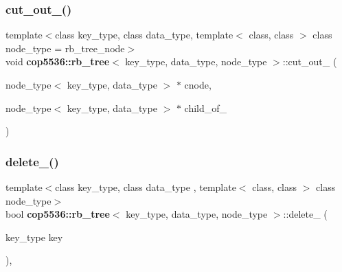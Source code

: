 \mbox{\label{classcop5536_1_1rb__tree_aa3fbcedf69c1875064fbb6b2befd74bf}} 
\subsubsection{cut\_out\_()}
{\footnotesize\ttfamily template$<$class key\+\_\+type, class data\+\_\+type, template$<$ class, class $>$ class node\+\_\+type = rb\+\_\+tree\+\_\+node$>$ \\
void \textbf{ cop5536\+::rb\+\_\+tree}$<$ key\+\_\+type, data\+\_\+type, node\+\_\+type $>$\+::cut\+\_\+out\+\_\+ (\begin{DoxyParamCaption}\item[{node\+\_\+type$<$ key\+\_\+type, data\+\_\+type $>$ $\ast$}]{cnode,  }\item[{node\+\_\+type$<$ key\+\_\+type, data\+\_\+type $>$ $\ast$}]{child\+\_\+of\+\_\+ }\end{DoxyParamCaption})}

\mbox{\label{classcop5536_1_1rb__tree_a82fcc1eec04d1c16b384aba305fd23f5}} 
\subsubsection{delete\_()}
{\footnotesize\ttfamily template$<$class key\+\_\+type, class data\+\_\+type , template$<$ class, class $>$ class node\+\_\+type$>$ \\
bool \textbf{ cop5536\+::rb\+\_\+tree}$<$ key\+\_\+type, data\+\_\+type, node\+\_\+type $>$\+::delete\+\_\+ (\begin{DoxyParamCaption}\item[{key\+\_\+type}]{key }\end{DoxyParamCaption})\hspace{0.3cm}{\ttfamily [inline]}, {\ttfamily [virtual]}}

